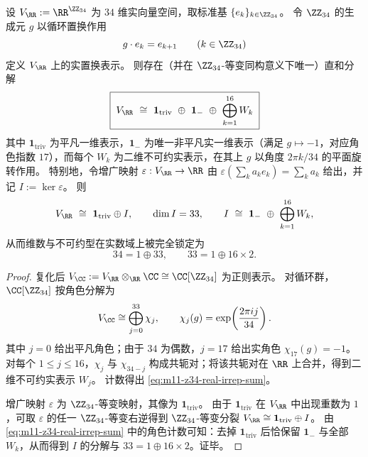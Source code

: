 \begin{theorem}\label{thm:m11-z34-real-irrep-decomposition}
设 \(V_{\RR}:=\RR^{\ZZ_{34}}\) 为 \(34\) 维实向量空间，取标准基 \(\{e_k\}_{k\in\ZZ_{34}}\)。
令 \(\ZZ_{34}\) 的生成元 \(g\) 以循环置换作用
\[
g\cdot e_k=e_{k+1}\qquad(k\in\ZZ_{34})
\]
定义 \(V_{\RR}\) 上的实置换表示。
则存在（并在 \(\ZZ_{34}\)-等变同构意义下唯一）直和分解
\begin{equation}\label{eq:m11-z34-real-irrep-sum}
\boxed{\;
V_{\RR}\ \cong\ \mathbf 1_{\mathrm{triv}}\ \oplus\ \mathbf 1_{-}\ \oplus\ \bigoplus_{k=1}^{16}W_k\;}
\end{equation}
其中 \(\mathbf 1_{\mathrm{triv}}\) 为平凡一维表示，\(\mathbf 1_{-}\) 为唯一非平凡实一维表示（满足 \(g\mapsto -1\)，对应角色指数 \(17\)），而每个 \(W_k\) 为二维不可约实表示，在其上 \(g\) 以角度 \(2\pi k/34\) 的平面旋转作用。
特别地，令增广映射 \(\varepsilon:V_{\RR}\to\RR\) 由
\(
\varepsilon(\sum_k a_ke_k)=\sum_k a_k
\)
给出，并记 \(I:=\ker\varepsilon\)。
则
\[
V_{\RR}\ \cong\ \mathbf 1_{\mathrm{triv}}\oplus I,
\qquad
\dim I=33,
\qquad
I\ \cong\ \mathbf 1_{-}\ \oplus\ \bigoplus_{k=1}^{16}W_k,
\]
从而维数与不可约型在实数域上被完全锁定为
\[
34=1\oplus 33,
\qquad
33=1\oplus 16\times 2.
\]
\end{theorem}
\begin{proof}
复化后 \(V_{\CC}:=V_{\RR}\otimes_{\RR}\CC\cong \CC[\ZZ_{34}]\) 为正则表示。
对循环群，\(\CC[\ZZ_{34}]\) 按角色分解为
\[
V_{\CC}\cong \bigoplus_{j=0}^{33}\chi_j,\qquad \chi_j(g)=\exp\!\left(\frac{2\pi i j}{34}\right).
\]
其中 \(j=0\) 给出平凡角色；由于 \(34\) 为偶数，\(j=17\) 给出实角色 \(\chi_{17}(g)=-1\)。
对每个 \(1\le j\le 16\)，\(\chi_j\) 与 \(\chi_{34-j}\) 构成共轭对；将该共轭对在 \(\RR\) 上合并，得到二维不可约实表示 \(W_j\)。
计数得出 \eqref{eq:m11-z34-real-irrep-sum}。
\par
增广映射 \(\varepsilon\) 为 \(\ZZ_{34}\)-等变映射，其像为 \(\mathbf 1_{\mathrm{triv}}\)。
由于 \(\mathbf 1_{\mathrm{triv}}\) 在 \(V_{\RR}\) 中出现重数为 \(1\)，可取 \(\varepsilon\) 的任一 \(\ZZ_{34}\)-等变右逆得到 \(\ZZ_{34}\)-等变分裂
\(
V_{\RR}\cong \mathbf 1_{\mathrm{triv}}\oplus I
\)。
由 \eqref{eq:m11-z34-real-irrep-sum} 中的角色计数可知：去掉 \(\mathbf 1_{\mathrm{triv}}\) 后恰保留 \(\mathbf 1_-\) 与全部 \(W_k\)，从而得到 \(I\) 的分解与 \(33=1\oplus 16\times 2\)。证毕。
\end{proof}

